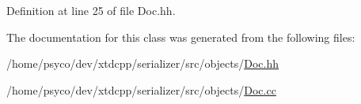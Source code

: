 Definition at line 25 of file Doc.\+hh.



The documentation for this class was generated from the following files\+:\begin{DoxyCompactItemize}
\item 
/home/psyco/dev/xtdcpp/serializer/src/objects/\hyperlink{Doc_8hh}{Doc.\+hh}\item 
/home/psyco/dev/xtdcpp/serializer/src/objects/\hyperlink{Doc_8cc}{Doc.\+cc}\end{DoxyCompactItemize}
